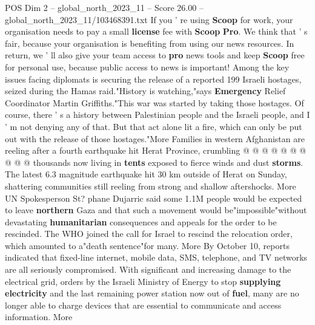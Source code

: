 \begin{textsample}{POS Dim 2 – global\_north\_2023\_11 – Score 26.00 – global\_north\_2023\_11/103468391.txt}
If you ' re using \textbf{Scoop} for work, your organisation needs to pay a small \textbf{license} fee with \textbf{Scoop} \textbf{Pro}.
We think that ' s fair, because your organisation is benefiting from using our news resources.
In return, we ' ll also give your team access to \textbf{pro} news tools and keep \textbf{Scoop} free for personal use, because public access to news is important!
Among the key issues facing diplomats is securing the release of a reported 199 Israeli hostages, seized during the Hamas raid."History is watching,"says \textbf{Emergency} Relief Coordinator Martin Griffiths."This war was started by taking those hostages.
Of course, there ' s a history between Palestinian people and the Israeli people, and I ' m not denying any of that.
But that act alone lit a fire, which can only be put out with the release of those hostages."More Families in western Afghanistan are reeling after a fourth earthquake hit Herat Province, crumbling @ @ @ @ @ @ @ @ @ @ thousands now living in \textbf{tents} exposed to fierce winds and dust \textbf{storms}.
The latest 6.3 magnitude earthquake hit 30 km outside of Herat on Sunday, shattering communities still reeling from strong and shallow aftershocks.
More UN Spokesperson St? phane Dujarric said some 1.1M people would be expected to leave \textbf{northern} Gaza and that such a movement would be"impossible"without devastating \textbf{humanitarian} consequences and appeals for the order to be rescinded.
The WHO joined the call for Israel to rescind the relocation order, which amounted to a"death sentence"for many.
More By October 10, reports indicated that fixed-line internet, mobile data, SMS, telephone, and TV networks are all seriously compromised.
With significant and increasing damage to the electrical grid, orders by the Israeli Ministry of Energy to stop \textbf{supplying} \textbf{electricity} and the last remaining power station now out of \textbf{fuel}, many are no longer able to charge devices that are essential to communicate and access information.
More

\end{textsample}
